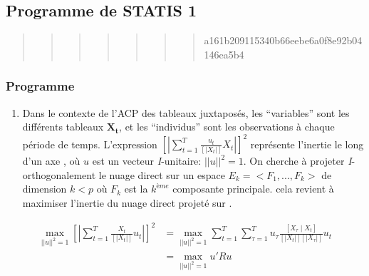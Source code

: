 \documentclass[
]{article}
\providecommand{\tightlist}{%
  \setlength{\itemsep}{0pt}\setlength{\parskip}{0pt}}
\begin{document}
\hypertarget{programme-de-statis-1}{%
\subsection{Programme de STATIS 1}\label{programme-de-statis-1}}

\begin{quote}
\begin{quote}
\begin{quote}
\begin{quote}
\begin{quote}
\begin{quote}
\begin{quote}
a161b209115340b66eebe6a0f8e92b04146ea5b4
\end{quote}
\end{quote}
\end{quote}
\end{quote}
\end{quote}
\end{quote}
\end{quote}

\hypertarget{programme}{%
\subsubsection{Programme}\label{programme}}

\begin{enumerate}
\def\labelenumi{\alph{enumi})}
\tightlist
\item
  Dans le contexte de l'ACP des tableaux juxtaposés, les ``variables''
  sont les différents tableaux \(\mathbf{X_t}\), et les ``individus''
  sont les observations à chaque période de temps. L'expression
  \(\left[\left| \sum_{t=1}^{T} \frac{u_t}{\left[\left| X_t \right|\right]} X_t \right|\right]^2\)
  représente l'inertie le long d'un axe \(< u >\), où \(u\) est un
  vecteur \emph{I}-unitaire: \(\left|\left| u \right|\right|^2 = 1\). On
  cherche à projeter \emph{I}-orthogonalement le nuage direct sur un
  espace \(E_k = < F_1,...,F_k >\) de dimension \(k < p\) où \(F_k\) est
  la \(k^{ème}\) composante principale. cela revient à maximiser
  l'inertie du nuage direct projeté sur \(< u >\).
\end{enumerate}

\begin{align*}
\max_{\left|\left| u \right|\right|^2 = 1} \left[\left| \sum_{t=1}^{T} \frac{X_t}{\left[\left| X_t \right|\right]} u_t \right|\right]^2 &=
\max_{\left|\left| u \right|\right|^2 = 1} \sum_{t=1}^{T} \sum_{\tau =1}^{T} u_{\tau} \frac{[X_{\tau} \mid X_t]}{\left[\left| X_t \right|\right] \left[\left| X_{\tau} \right|\right]} u_t \\
&= \max_{\left|\left| u \right|\right|^2 = 1} u'R u
\end{align*}
\end{document}
